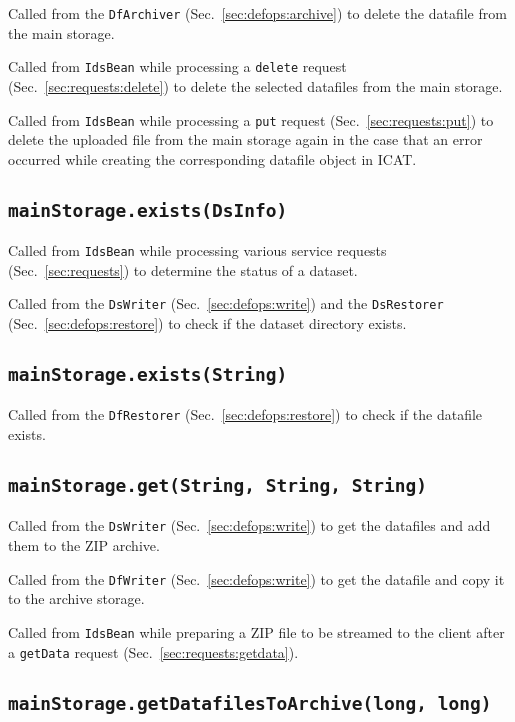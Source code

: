 \documentclass[paper=a4]{scrartcl}
\begin{document}
Called from the \texttt{DfArchiver} (Sec.~\ref{sec:defops:archive})
to delete the datafile from the main storage.

Called from \texttt{IdsBean} while processing a \texttt{delete}
request (Sec.~\ref{sec:requests:delete}) to delete the selected
datafiles from the main storage.

Called from \texttt{IdsBean} while processing a \texttt{put} request
(Sec.~\ref{sec:requests:put}) to delete the uploaded file from the
main storage again in the case that an error occurred while creating
the corresponding datafile object in ICAT.

\subsection{\texttt{mainStorage.exists(DsInfo)}}

Called from \texttt{IdsBean} while processing various service requests
(Sec.~\ref{sec:requests}) to determine the status of a dataset.

Called from the \texttt{DsWriter} (Sec.~\ref{sec:defops:write}) and
the \texttt{DsRestorer} (Sec.~\ref{sec:defops:restore}) to check if
the dataset directory exists.

\subsection{\texttt{mainStorage.exists(String)}}

Called from the \texttt{DfRestorer} (Sec.~\ref{sec:defops:restore})
to check if the datafile exists.

\subsection{\texttt{mainStorage.get(String, String, String)}}

Called from the \texttt{DsWriter} (Sec.~\ref{sec:defops:write}) to
get the datafiles and add them to the ZIP archive.

Called from the \texttt{DfWriter} (Sec.~\ref{sec:defops:write}) to
get the datafile and copy it to the archive storage.

Called from \texttt{IdsBean} while preparing a ZIP file to be streamed
to the client after a \texttt{getData} request
(Sec.~\ref{sec:requests:getdata}).

\subsection{\texttt{mainStorage.getDatafilesToArchive(long, long)}}
\end{document}
